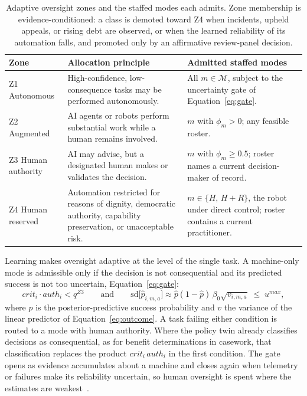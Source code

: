 \documentclass[utf8]{FrontiersinHarvard}
\begin{document}
	\begin{table}[!htbp]
		\caption{Adaptive oversight zones and the staffed modes each admits. Zone membership is evidence-conditioned: a class is demoted toward Z4 when incidents, upheld appeals, or rising debt are observed, or when the learned reliability of its automation falls, and promoted only by an affirmative review-panel decision.}
		\label{tab:zones}
		\small
		\begin{tabularx}{\textwidth}{p{2.1cm}p{4.9cm}X}
			\toprule
			\textbf{Zone} & \textbf{Allocation principle} & \textbf{Admitted staffed modes}\\
			\midrule
			Z1 Autonomous & High-confidence, low-consequence tasks may be performed autonomously. & All $m\in\mathcal{M}$, subject to the uncertainty gate of Equation~\eqref{eq:gate}.\\
			Z2 Augmented & AI agents or robots perform substantial work while a human remains involved. & $m$ with $\phi_m>0$; any feasible roster.\\
			Z3 Human authority & AI may advise, but a designated human makes or validates the decision. & $m$ with $\phi_m\ge 0.5$; roster names a current decision-maker of record.\\
			Z4 Human reserved & Automation restricted for reasons of dignity, democratic authority, capability preservation, or unacceptable risk. & $m\in\{H,\,H{+}R\}$, the robot under direct control; roster contains a current practitioner.\\
			\bottomrule
		\end{tabularx}
	\end{table}

	Learning makes oversight adaptive at the level of the single task. A machine-only mode is admissible only if the decision is not consequential and its predicted success is not too uncertain, Equation~\eqref{eq:gate}:
	\begin{equation}
		crit_i\cdot auth_i < q^{Z3}
		\qquad\text{and}\qquad
		\mathrm{sd}\bigl[\hat p_{i,m,a}\bigr] \approx \hat p(1-\hat p)\,\beta_0\sqrt{v_{i,m,a}} \;\le\; u^{max},
		\label{eq:gate}
	\end{equation}
	where $\hat p$ is the posterior-predictive success probability and $v$ the variance of the linear predictor of Equation~\eqref{eq:outcome}. A task failing either condition is routed to a mode with human authority. Where the policy twin already classifies decisions as consequential, as for benefit determinations in casework, that classification replaces the product $crit_i\,auth_i$ in the first condition. The gate opens as evidence accumulates about a machine and closes again when telemetry or failures make its reliability uncertain, so human oversight is spent where the estimates are weakest~\citep{Basich2020}.
\end{document}
